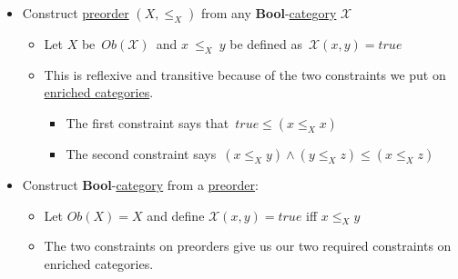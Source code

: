 \begin{itemize}
    \item Construct \href{doc/1 math/Seven Sketches in Compositionality/Chapter 1: Generative Effects/3 Preorders/1 Preorder}{preorder} $(X,\leq_X)$ from any \textbf{Bool}-\href{doc/1 math/Seven Sketches in Compositionality/Chapter 2: Resource theories/3 Enrichment/1 V-categories/1 V-category}{category} $\mathcal{X}$
          \begin{itemize}
            \item Let $X$ be \,$Ob(\mathcal{X})$\, and $x\ \leq_X\ y$ be defined as \,$\mathcal{X}(x,y)=true$\,
            \item This is reflexive and transitive because of the two constraints we put on \href{doc/1 math/Seven Sketches in Compositionality/Chapter 2: Resource theories/3 Enrichment/1 V-categories/1 V-category}{enriched categories}.
                  \begin{itemize}
                    \item The first constraint says that \,$true \leq (x \leq_X x)$\,
                    \item The second constraint says \,$(x \leq_X y) \land (y \leq_X z) \leq (x \leq_X z)$\,
                  \end{itemize}
          \end{itemize}
    \item Construct \textbf{Bool}-\href{doc/1 math/Seven Sketches in Compositionality/Chapter 2: Resource theories/3 Enrichment/1 V-categories/1 V-category}{category} from a \href{doc/1 math/Seven Sketches in Compositionality/Chapter 1: Generative Effects/3 Preorders/1 Preorder}{preorder}: \,
          \begin{itemize}
            \item Let $Ob(X)=X$ and define $\mathcal{X}(x,y)=true$ iff $x \leq_X y$
            \item The two constraints on preorders give us our two required constraints on enriched categories.
          \end{itemize}\,
  \end{itemize}
